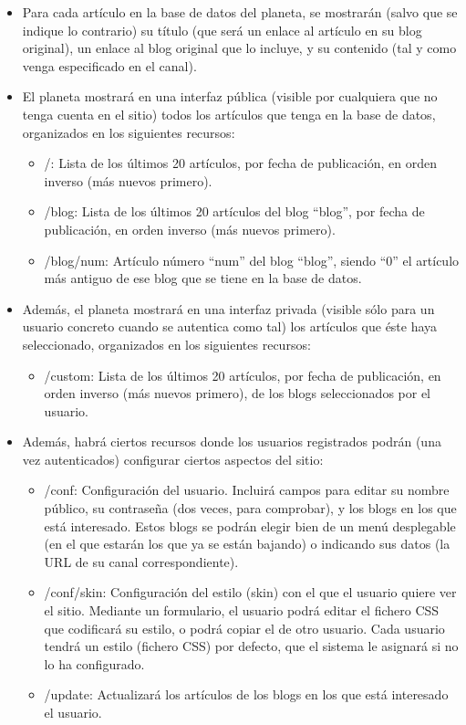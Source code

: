 \begin{itemize}
\item Para cada artículo en la base de datos del planeta, se mostrarán (salvo que se indique lo contrario) su título (que será un enlace al artículo en su blog original), un enlace al blog original que lo incluye, y su contenido (tal y como venga especificado en el canal).
\item El planeta mostrará en una interfaz pública (visible por cualquiera que no tenga cuenta en el sitio) todos los artículos que tenga en la base de datos, organizados en los siguientes recursos:

  \begin{itemize}
  \item /: Lista de los últimos 20 artículos, por fecha de publicación, en orden inverso (más nuevos primero).
  \item /blog: Lista de los últimos 20 artículos del blog ``blog'', por fecha de publicación, en orden inverso (más nuevos primero).
  \item /blog/num: Artículo número ``num'' del blog ``blog'', siendo ``0'' el artículo más antiguo de ese blog que se tiene en la base de datos.
  \end{itemize}

\item Además, el planeta mostrará en una interfaz privada (visible sólo para un usuario concreto cuando se autentica como tal) los artículos que éste haya seleccionado, organizados en los siguientes recursos:

  \begin{itemize}
  \item /custom: Lista de los últimos 20 artículos, por fecha de publicación, en orden inverso (más nuevos primero), de los blogs seleccionados por el usuario.
  \end{itemize}

\item Además, habrá ciertos recursos donde los usuarios registrados podrán (una vez autenticados) configurar ciertos aspectos del sitio:

  \begin{itemize}
  \item /conf: Configuración del usuario. Incluirá campos para editar su nombre público, su contraseña (dos veces, para comprobar), y los blogs en los que está interesado. Estos blogs se podrán elegir bien de un menú desplegable (en el que estarán los que ya se están bajando) o indicando sus datos (la URL de su canal correspondiente).
  \item /conf/skin: Configuración del estilo (skin) con el que el usuario quiere ver el sitio. Mediante un formulario, el usuario podrá editar el fichero CSS que codificará su estilo, o podrá copiar el de otro usuario. Cada usuario tendrá un estilo (fichero CSS) por defecto, que el sistema le asignará si no lo ha configurado.
  \item /update: Actualizará los artículos de los blogs en los que está interesado el usuario.
  \end{itemize}


\end{itemize}
